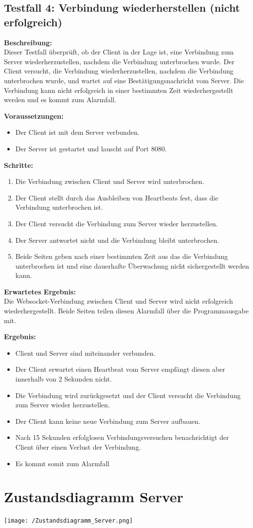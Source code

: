 \documentclass[thesis.tex]{subfiles}
\begin{document}
\subsection*{Testfall 4: Verbindung wiederherstellen (nicht erfolgreich)}

\textbf{Beschreibung:}\\
Dieser Testfall überprüft, ob der Client in der Lage ist, eine Verbindung zum Server wiederherzustellen, nachdem die Verbindung unterbrochen wurde. Der Client versucht, die Verbindung wiederherzustellen, nachdem die Verbindung unterbrochen wurde, und wartet auf eine Bestätigungsnachricht vom Server. Die Verbindung kann nicht erfolgreich in einer bestimmten Zeit wiederhergestellt werden und es kommt zum Alarmfall.

\textbf{Voraussetzungen:}
\begin{itemize}
    \item Der Client ist mit dem Server verbunden.
    \item Der Server ist gestartet und lauscht auf Port 8080.
\end{itemize}

\textbf{Schritte:}
\begin{enumerate}
    \item Die Verbindung zwischen Client und Server wird unterbrochen.
    \item Der Client stellt durch das Ausbleiben von Heartbeats fest, dass die Verbindung unterbrochen ist.
    \item Der Client versucht die Verbindung zum Server wieder herzustellen.
    \item Der Server antwortet nicht und die Verbindung bleibt unterbrochen.
    \item Beide Seiten geben nach einer bestimmten Zeit aus das die Verbindung unterbrochen ist und eine dauerhafte Überwachung nicht sichergestellt werden kann.
\end{enumerate}

\textbf{Erwartetes Ergebnis:}\\
Die Websocket-Verbindung zwischen Client und Server wird nicht erfolgreich wiederhergestellt. Beide Seiten teilen diesen Alarmfall über die Programmausgabe mit.

\textbf{Ergebnis:}
\begin{itemize}
    \item Client und Server sind miteinander verbunden.
    \item Der Client erwartet einen Heartbeat vom Server empfängt diesen aber innerhalb von 2 Sekunden nicht.
    \item Die Verbindung wird zurückgesetzt und der Client versucht die Verbindung zum Server wieder herzustellen.
    \item Der Client kann keine neue Verbindung zum Server aufbauen.
    \item Nach 15 Sekunden erfolglosen Verbindungsversuchen benachrichtigt der Client über einen Verlust der Verbindung.
    \item Es kommt somit zum Alarmfall
\end{itemize}

\section{Zustandsdiagramm Server}\label{anhang:zustandsdiagram_server}

\texttt{[image: /Zustandsdiagramm\_Server.png]}
\end{document}

